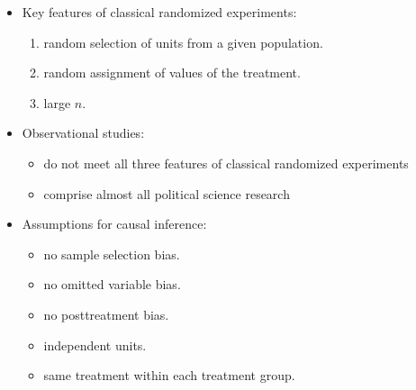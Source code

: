 \documentclass[20pt,landscape,pdftex]{foils}
\begin{document}


\hypersetup{pdfpagetransition=Replace}

\begin{itemize}
\item Key features of classical randomized experiments:\pause
  \begin{enumerate}
  \item random selection of units from a given population.\pause
  \item random assignment of values of the treatment.\pause
  \item large $n$.\pause
  \end{enumerate}
\item Observational studies:\pause
  \begin{itemize}
  \item do not meet all three features of classical randomized
    experiments\pause
  \item comprise almost all political science research
  \end{itemize}

\item Assumptions for causal inference:\pause
  \begin{itemize}
  \item no sample selection bias.\pause
  \item no omitted variable bias.\pause
  \item no posttreatment bias.\pause
  \item independent units.\pause
  \item same treatment within each treatment group.\pause
  \end{itemize}
\end{itemize}



\hypersetup{pdfpagetransition=Replace}
\end{document}
